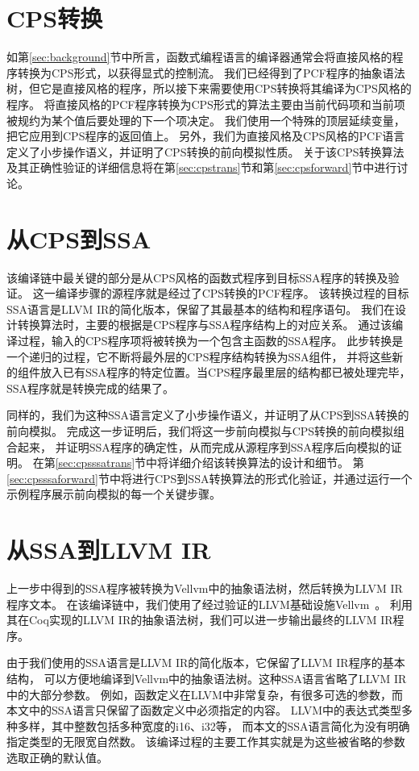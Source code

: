 \section{CPS转换}

如第\ref{sec:background}节中所言，函数式编程语言的编译器通常会将直接风格的程序转换为CPS形式，以获得显式的控制流。
我们已经得到了PCF程序的抽象语法树，但它是直接风格的程序，所以接下来需要使用CPS转换将其编译为CPS风格的程序。
将直接风格的PCF程序转换为CPS形式的算法主要由当前代码项和当前项被规约为某个值后要处理的下一个项决定。
我们使用一个特殊的顶层延续变量，把它应用到CPS程序的返回值上。
另外，我们为直接风格及CPS风格的PCF语言定义了小步操作语义，并证明了CPS转换的前向模拟性质。
关于该CPS转换算法及其正确性验证的详细信息将在第\ref{sec:cpstrans}节和第\ref{sec:cpsforward}节中进行讨论。

\section{从CPS到SSA}

该编译链中最关键的部分是从CPS风格的函数式程序到目标SSA程序的转换及验证。
这一编译步骤的源程序就是经过了CPS转换的PCF程序。
该转换过程的目标SSA语言是LLVM IR的简化版本，保留了其最基本的结构和程序语句。
我们在设计转换算法时，主要的根据是CPS程序与SSA程序结构上的对应关系。
通过该编译过程，输入的CPS程序项将被转换为一个包含主函数的SSA程序。
此步转换是一个递归的过程，它不断将最外层的CPS程序结构转换为SSA组件，
并将这些新的组件放入已有SSA程序的特定位置。当CPS程序最里层的结构都已被处理完毕，
SSA程序就是转换完成的结果了。

同样的，我们为这种SSA语言定义了小步操作语义，并证明了从CPS到SSA转换的前向模拟。
完成这一步证明后，我们将这一步前向模拟与CPS转换的前向模拟组合起来，
并证明SSA程序的确定性，从而完成从源程序到SSA程序后向模拟的证明。
在第\ref{sec:cpsssatrans}节中将详细介绍该转换算法的设计和细节。
第\ref{sec:cpsssaforward}节中将进行CPS到SSA转换算法的形式化验证，并通过运行一个示例程序展示前向模拟的每一个关键步骤。

\section{从SSA到LLVM IR}

上一步中得到的SSA程序被转换为Vellvm中的抽象语法树，然后转换为LLVM IR程序文本。
在该编译链中，我们使用了经过验证的LLVM基础设施Vellvm~\cite{zakowski2021modular}。
利用其在Coq实现的LLVM IR的抽象语法树，我们可以进一步输出最终的LLVM IR程序。

由于我们使用的SSA语言是LLVM IR的简化版本，它保留了LLVM IR程序的基本结构，
可以方便地编译到Vellvm中的抽象语法树。这种SSA语言省略了LLVM IR中的大部分参数。
例如，函数定义在LLVM中非常复杂，有很多可选的参数，而本文中的SSA语言只保留了函数定义中必须指定的内容。
LLVM中的表达式类型多种多样，其中整数包括多种宽度的i16、i32等，
而本文的SSA语言简化为没有明确指定类型的无限宽自然数。
该编译过程的主要工作其实就是为这些被省略的参数选取正确的默认值。

